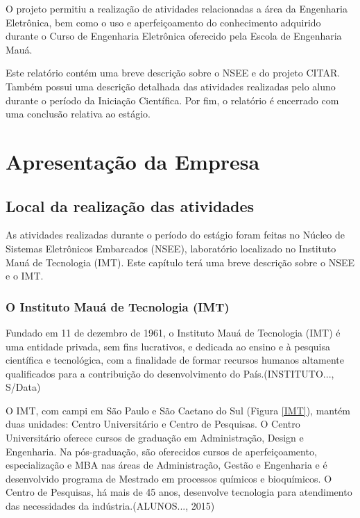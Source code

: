\documentclass[
	12pt,				%
	openright,			%
	twoside,			%
	a4paper,			%
	english,			%
	french,				%
	spanish,			%
	brazil				%
	]{abntex2}
\begin{document}
	O projeto permitiu a realização de atividades relacionadas a área da Engenharia Eletrônica, bem como o uso e aperfeiçoamento do conhecimento adquirido durante o Curso de Engenharia Eletrônica oferecido pela Escola de Engenharia Mauá.
	
	Este relatório contém uma breve descrição sobre o NSEE e do projeto CITAR. Também possui uma descrição detalhada das atividades realizadas pelo aluno durante o período da Iniciação Científica. Por fim, o relatório é encerrado com uma conclusão relativa ao estágio.
	

\part{Apresentação da Empresa}

\chapter{Local da realização das atividades}
As atividades realizadas durante o período do estágio foram feitas no Núcleo de Sistemas Eletrônicos Embarcados (NSEE), laboratório localizado no Instituto Mauá de Tecnologia (IMT). Este capítulo terá uma breve descrição sobre o NSEE e o IMT.

\section{O Instituto Mauá de Tecnologia (IMT)}
Fundado em 11 de dezembro de 1961, o Instituto Mauá de Tecnologia (IMT) é uma entidade privada, sem fins lucrativos, e dedicada ao ensino e à pesquisa científica e tecnológica, com a finalidade de formar recursos humanos altamente qualificados para a contribuição do desenvolvimento do País.(\uppercase{Instituto...}, S/Data) \let\thefootnote\relax{}

O IMT, com campi em São Paulo e São Caetano do Sul (Figura \ref{IMT}), mantém duas unidades: Centro Universitário e Centro de Pesquisas. O Centro Universitário oferece cursos de graduação em Administração, Design e Engenharia. Na pós-graduação, são oferecidos cursos de aperfeiçoamento, especialização e MBA nas áreas de Administração, Gestão e Engenharia e é desenvolvido programa de Mestrado em processos químicos e bioquímicos. O Centro de Pesquisas, há mais de 45 anos, desenvolve tecnologia para atendimento das necessidades da indústria.(\uppercase{Alunos...}, 2015) \let\thefootnote\relax{}
\end{document}
